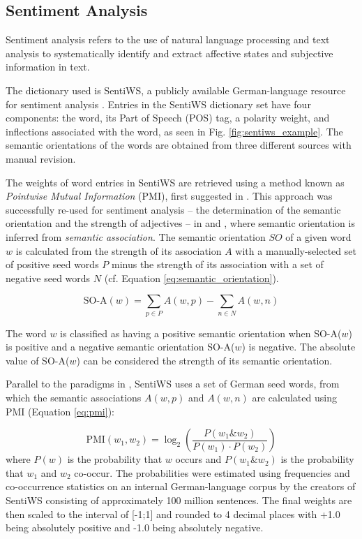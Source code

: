 \documentclass[12pt,onecolumn,twoside]{layout}
\begin{document}
\subsection*{Sentiment Analysis}

Sentiment analysis refers to the use of natural language processing and text analysis to systematically identify and extract affective states and subjective information in text. %

The dictionary used is SentiWS, a publicly available German-language resource for sentiment analysis \cite{REMUS10.490}. Entries in the SentiWS dictionary set have four components: the word, its Part of Speech (POS) tag, a polarity weight, and inflections associated with the word, as seen in Fig. \ref{fig:sentiws_example}. The semantic orientations of the words are obtained from three different sources with manual revision. 

The weights of word entries in SentiWS are retrieved using a method known as \emph{Pointwise Mutual Information} (PMI), first suggested in \cite{church-hanks-1990-word}. This approach was successfully re-used for sentiment analysis -- the determination of the semantic orientation and the strength of adjectives -- in \cite{Turney2002} and \cite{Turney2003}, where semantic orientation is inferred from \emph{semantic association}. The semantic orientation \(SO\) of a given word \(w\) is calculated from the strength of its association \(A\) with a manually-selected set of positive seed words \(P\) minus the strength of its association with a set of negative seed words \(N\) (cf. Equation \ref{eq:semantic_orientation}). 

\begin{equation}
\label{eq:semantic_orientation}
\text{SO-A}(w) = \sum_{p \in P}A(w,p) - \sum_{n \in N}A(w,n)
\end{equation}

The word \(w\) is classified as having a positive semantic orientation when SO-A(\(w\)) is positive and a negative semantic orientation SO-A(\(w\)) is negative. The absolute value of SO-A(\(w\)) can be considered the strength of its semantic orientation. 

Parallel to the paradigms in \cite{Turney2003}, SentiWS uses a set of German seed words, from which the semantic associations \(A(w,p)\) and \(A(w,n)\) are calculated using PMI (Equation \ref{eq:pmi}): 

\begin{equation}
\label{eq:pmi}
\text{PMI}(w_1,w_2) = \log_2\left(\frac{P(w_1 \& w_2)}{P(w_1) \cdot P(w_2)}\right)
\end{equation}
where \(P(w)\) is the probability that \(w\) occurs and \(P(w_1 \& w_2)\) is the probability that \(w_1\) and \(w_2\) co-occur. The probabilities were estimated using frequencies and co-occurrence statistics on an internal German-language corpus by the creators of SentiWS consisting of approximately 100 million sentences. The final weights are then scaled to the interval of [-1;1] and rounded to 4 decimal places with +1.0 being absolutely positive and -1.0 being absolutely negative.
\end{document}
